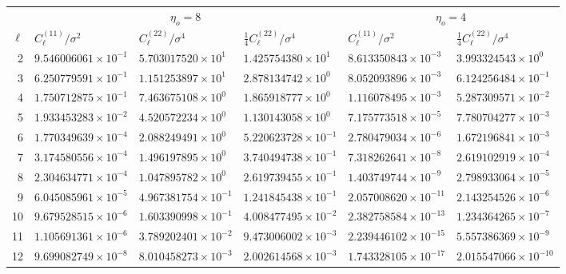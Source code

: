 \begin{table}[t]
\centering\footnotesize
\setlength{\tabcolsep}{4pt}
\begin{tabular}{r|lll|ll}
\hline
 & \multicolumn{3}{c|}{$\eta_o=8$} & \multicolumn{2}{c}{$\eta_o=4$}\\
$\ell$ & $C^{(11)}_\ell/\sigma^2$ & $C^{(22)}_\ell/\sigma^4$ & $\tfrac14C^{(22)}_\ell/\sigma^4$ & $C^{(11)}_\ell/\sigma^2$ & $\tfrac14C^{(22)}_\ell/\sigma^4$\\
\hline
2 & $9.546006061{\times}10^{-1}$ & $5.703017520{\times}10^{1}$ & $1.425754380{\times}10^{1}$ & $8.613350843{\times}10^{-3}$ & $3.993324543{\times}10^{0}$\\
3 & $6.250779591{\times}10^{-1}$ & $1.151253897{\times}10^{1}$ & $2.878134742{\times}10^{0}$ & $8.052093896{\times}10^{-3}$ & $6.124256484{\times}10^{-1}$\\
4 & $1.750712875{\times}10^{-1}$ & $7.463675108{\times}10^{0}$ & $1.865918777{\times}10^{0}$ & $1.116078495{\times}10^{-3}$ & $5.287309571{\times}10^{-2}$\\
5 & $1.933453283{\times}10^{-2}$ & $4.520572234{\times}10^{0}$ & $1.130143058{\times}10^{0}$ & $7.175773518{\times}10^{-5}$ & $7.780704277{\times}10^{-3}$\\
6 & $1.770349639{\times}10^{-4}$ & $2.088249491{\times}10^{0}$ & $5.220623728{\times}10^{-1}$ & $2.780479034{\times}10^{-6}$ & $1.672196841{\times}10^{-3}$\\
7 & $3.174580556{\times}10^{-4}$ & $1.496197895{\times}10^{0}$ & $3.740494738{\times}10^{-1}$ & $7.318262641{\times}10^{-8}$ & $2.619102919{\times}10^{-4}$\\
8 & $2.304634771{\times}10^{-4}$ & $1.047895782{\times}10^{0}$ & $2.619739455{\times}10^{-1}$ & $1.403749744{\times}10^{-9}$ & $2.798933064{\times}10^{-5}$\\
9 & $6.045085961{\times}10^{-5}$ & $4.967381754{\times}10^{-1}$ & $1.241845438{\times}10^{-1}$ & $2.057008620{\times}10^{-11}$ & $2.143254526{\times}10^{-6}$\\
10 & $9.679528515{\times}10^{-6}$ & $1.603390998{\times}10^{-1}$ & $4.008477495{\times}10^{-2}$ & $2.382758584{\times}10^{-13}$ & $1.234364265{\times}10^{-7}$\\
11 & $1.105691361{\times}10^{-6}$ & $3.789202401{\times}10^{-2}$ & $9.473006002{\times}10^{-3}$ & $2.239446102{\times}10^{-15}$ & $5.557386369{\times}10^{-9}$\\
12 & $9.699082749{\times}10^{-8}$ & $8.010458273{\times}10^{-3}$ & $2.002614568{\times}10^{-3}$ & $1.743328105{\times}10^{-17}$ & $2.015547066{\times}10^{-10}$\\

\end{tabular}
\end{table}

